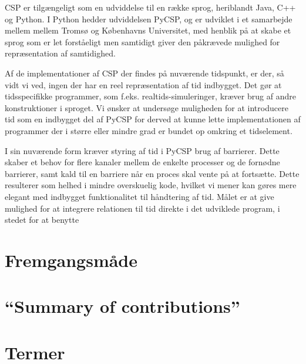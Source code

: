 CSP er tilgængeligt som en udviddelse til en række sprog, heriblandt Java, C++ 
og Python. I Python hedder udviddelsen PyCSP, og er udviklet i et samarbejde 
mellem mellem Tromsø og Københavns Universitet, med henblik på at skabe et 
sprog som er let forståeligt men samtidigt giver den påkrævede mulighed for 
repræsentation af samtidighed.  


Af de implementationer af CSP der findes på nuværende tidspunkt, er der, så 
vidt vi ved, ingen der har en reel repræsentation af tid indbygget. Det gør at 
tidsspecifikke programmer, som f.eks. realtids-simuleringer, kræver brug af 
andre konstruktioner i sproget.
Vi ønsker at undersøge muligheden for at introducere tid som en indbygget del 
af PyCSP for derved at kunne lette implementationen af programmer der i større 
eller mindre grad er bundet op omkring et tidselement. 


I sin nuværende form kræver styring af tid i PyCSP brug af 
barrierer. Dette skaber et 
behov for flere kanaler mellem de enkelte processer og de fornødne barrierer, 
samt kald til en barriere når en proces skal vente på at fortsætte.  Dette 
resulterer som helhed i mindre overskuelig kode, hvilket vi mener kan gøres 
mere elegant med indbygget funktionalitet til håndtering af tid. Målet er at 
give mulighed for at integrere relationen til tid direkte i det udviklede 
program, i stedet for at benytte 

\subsection{\pycsp}\label{pycsp}

  \section{Fremgangsmåde}
  \section{``Summary of contributions''}
  \section{Termer}

